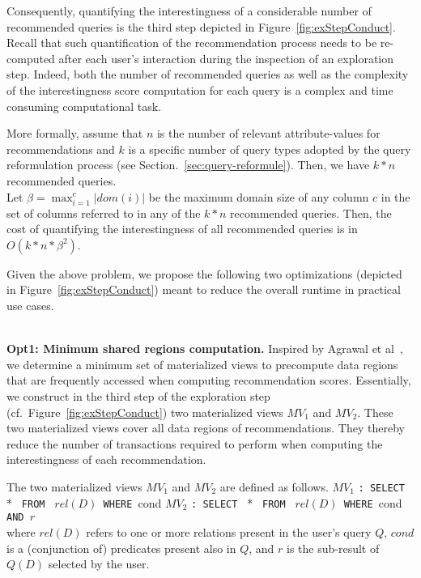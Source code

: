 Consequently, quantifying the interestingness of a considerable number of recommended queries is the third step depicted in Figure~\ref{fig:exStepConduct}. 
Recall that such quantification of the recommendation process needs to be re-computed after each user's interaction during the inspection of an exploration step. 
Indeed, both the number of recommended queries as well as the complexity of the interestingness score computation for each query is a complex and time consuming computational task. 

More formally, assume that $n$ is the number of relevant attribute-values for recommendations and $k$ is a specific number of query types adopted by the query reformulation process (see Section.~\ref{sec:query-reformule}). Then, we have $k*n$ recommended queries.\\
Let $\beta=\max_{i=1}^{c}|dom(i)|$ be the maximum domain size of any column $c$ in the set of columns referred to in any of the $k*n$ recommended queries.
Then, the cost of quantifying the interestingness of all recommended queries is in $O( k*n*\beta^{2})$.


Given the above problem, we propose the following two optimizations (depicted in Figure~\ref{fig:exStepConduct}) meant to reduce the overall runtime in practical use cases.

~~\\
\noindent \textbf{Opt1: Minimum shared regions computation.} 
Inspired by Agrawal et al~\cite{Agrawal:2000:ASM}, we determine a minimum set of materialized views to precompute data regions that are frequently accessed when computing recommendation scores. 
Essentially, we construct  in the third step of the exploration step (cf.~Figure~\ref{fig:exStepConduct}) two materialized views $MV_1$ and $MV_2$.
These two materialized views cover all data regions of recommendations. They thereby reduce the number of transactions required to perform when computing the interestingness of each recommendation.


The two materialized views $MV_1$ and $MV_2$ are defined as follows.
{\obeylines\obeyspaces
$MV_1$ \texttt{: SELECT } * \texttt{ FROM } $rel(D)$\texttt{ WHERE }cond 
}
{\obeylines\obeyspaces
$MV_2$ \texttt{: SELECT } * \texttt{ FROM } $rel(D)$\texttt{ WHERE }cond \texttt{ AND }$r$ %
}
\\
\noindent where $rel(D)$ refers to one or more relations present in the user's query $Q$, $cond$ is a (conjunction of) predicates present also in $Q$, and $r$ is the sub-result of $Q(D)$ selected by the user.

